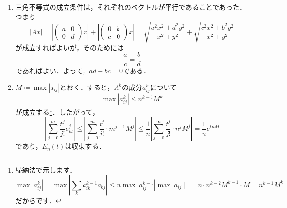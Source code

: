 \documentclass[a4paper,pdflatex,ja=standard]{bxjsarticle}
\begin{document}
\begin{enumerate}
  \item   
  三角不等式の成立条件は，それぞれのベクトルが平行であることであった．つまり
  \begin{equation}
    |Ax|
    =
    \left|
      \begin{pmatrix}
        a & 0 \\
        0 & d
      \end{pmatrix}
      x
    \right|
    +
    \left|
      \begin{pmatrix}
        0 & b \\
        c & 0
      \end{pmatrix}
      x
    \right|
    =
    \sqrt{\frac{a^{2}x^2+d^{2}y^{2}}{x^{2}+y^{2}}}
    +
    \sqrt{\frac{c^{2}x^2+b^{2}y^{2}}{x^{2}+y^{2}}}
  \end{equation}
  が成立すればよいが，そのためには
  \begin{equation}
    \frac{a}{c}
    =
    \frac{b}{d}
  \end{equation}
  であればよい．よって，$ad-bc=0$である．

  \item 
  $M\coloneqq \max{|a_{ij}|}$とおく．すると，$A^{k}$の成分$a_{ij}^{k}$について
  \begin{equation}
    \max{|a_{ij}^{k}|}\leq n^{k-1}M^{k}
  \end{equation}
  が成立する\footnote{帰納法で示します．
    \begin{equation}
      \max{|a_{ij}^{k}|}
      =
      \max{\left|\sum_{k}a_{ik}^{k-1}a_{kj}\right|}
      \leq
      n\max{|a_{ij}^{k-1}|}\max{|a_{ij}\|}
      =
      n\cdot n^{k-2}M^{k-1}\cdot M
      =
      n^{k-1}M^{k}
    \end{equation}
  だからです．}．したがって，
  \begin{equation}
    \left|
      \sum_{j=0}^{m}\frac{t^{j}}{j!}a_{kl}^{j}
    \right|
    \leq
    \left|
      \sum_{j=0}^{m}\frac{t^{j}}{j!}\cdot m^{j-1}M^{j}
    \right|
    \leq
    \frac{1}{n}
    \left|
      \sum_{j=0}^{\infty}\frac{t^{j}}{j!}\cdot n^{j}M^{j}
    \right|
    =
    \frac{1}{n}e^{tnM}
  \end{equation}
  であり，$E_{n}(t)$は収束する．


\end{enumerate}
\end{document}
